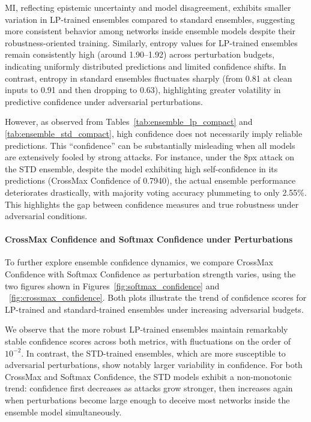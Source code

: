 MI, reflecting epistemic uncertainty and model disagreement, exhibits smaller variation in LP-trained ensembles compared to standard ensembles, suggesting more consistent behavior among networks inside ensemble models despite their robustness-oriented training. Similarly, entropy values for LP-trained ensembles remain consistently high (around 1.90–1.92) across perturbation budgets, indicating uniformly distributed predictions and limited confidence shifts. In contrast, entropy in standard ensembles fluctuates sharply (from 0.81 at clean inputs to 0.91 and then dropping to 0.63), highlighting greater volatility in predictive confidence under adversarial perturbations.

However, as observed from Tables~\ref{tab:ensemble_lp_compact} and \ref{tab:ensemble_std_compact}, high confidence does not necessarily imply reliable predictions. This “confidence” can be substantially misleading when all models are extensively fooled by strong attacks. For instance, under the 8px attack on the STD ensemble, despite the model exhibiting high self-confidence in its predictions (CrossMax Confidence of 0.7940), the actual ensemble performance deteriorates drastically, with majority voting accuracy plummeting to only 2.55\%. This highlights the gap between confidence measures and true robustness under adversarial conditions.


\paragraph{CrossMax Confidence and Softmax Confidence under Perturbations}

To further explore ensemble confidence dynamics, we compare CrossMax Confidence with Softmax Confidence as perturbation strength varies, using the two figures shown in Figures~\ref{fig:softmax_confidence} and ~\ref{fig:crossmax_confidence}. Both plots illustrate the trend of confidence scores for LP-trained and standard-trained ensembles under increasing adversarial budgets.

We observe that the more robust LP-trained ensembles maintain remarkably stable confidence scores across both metrics, with fluctuations on the order of $10^{-2}$. In contrast, the STD-trained ensembles, which are more susceptible to adversarial perturbations, show notably larger variability in confidence. For both CrossMax and Softmax Confidence, the STD models exhibit a non-monotonic trend: confidence first decreases as attacks grow stronger, then increases again when perturbations become large enough to deceive most networks inside the ensemble model simultaneously.

